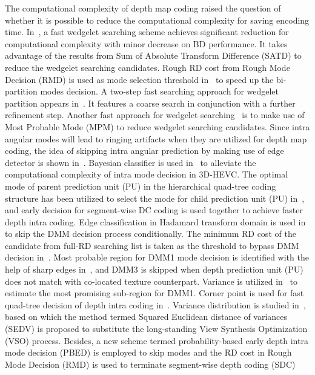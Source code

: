The computational complexity of depth map coding
raised the question of whether it is possible to reduce the computational
complexity for saving encoding time.
In~\parencite{RN76}, a fast wedgelet searching scheme achieves significant
reduction for computational complexity with minor decrease on BD performance.
It takes advantage of the results from
Sum of Absolute Transform Difference (SATD) to reduce the wedgelet searching
candidates.
Rough RD cost from Rough Mode Decision (RMD) is used as mode selection threshold
in~\parencite{RN90} to speed up the bi-partition modes decision.
A two-step fast searching approach for wedgelet partition
appears in~\parencite{RN126}.
It features a coarse search in conjunction with a further refinement step.
Another fast approach for wedgelet searching~\parencite{RN79}
is to make use of Most Probable Mode (MPM) to reduce wedgelet
searching candidates.
Since intra angular modes will lead to ringing artifacts
when they are utilized for depth map coding, the idea of skipping intra
angular prediction by making use of edge detector is shown in~\parencite{RN89}.
Bayesian classifier is used in~\parencite{RN102} to alleviate the computational
complexity of intra mode decision in 3D-HEVC\@.
The optimal mode of parent prediction unit (PU)
in the hierarchical quad-tree coding structure 
has been utilized to select
the mode for child prediction unit (PU) in~\parencite{RN131}, 
and early decision for segment-wise DC coding is used together 
to achieve faster depth intra coding.
Edge classification in Hadamard transform domain is used in~\parencite{RN86}
to skip the DMM decision process conditionally.
The minimum RD cost of the candidate from full-RD searching list is taken
as the threshold to bypass DMM decision in~\parencite{RN93}.
Most probable region for DMM1 mode decision is identified with the help
of sharp edges in~\parencite{RN209}, and DMM3 is skipped when depth
prediction unit (PU) does not match with co-located texture counterpart.
Variance is utilized in~\parencite{RN210} to estimate the most promising
sub-region for DMM1.
Corner point is used for fast quad-tree decision of depth intra coding
in~\parencite{RN211}.
Variance distribution is studied in~\parencite{RN111}, based on which the
method termed Squared Euclidean distance of variances (SEDV) is
proposed to substitute the long-standing View Synthesis Optimization (VSO)
process.
Besides, a new scheme termed probability-based early depth intra mode
decision (PBED) is employed to skip modes and the RD cost in
Rough Mode Decision (RMD) is used to terminate
segment-wise depth coding (SDC)~\parencite{RN123}
